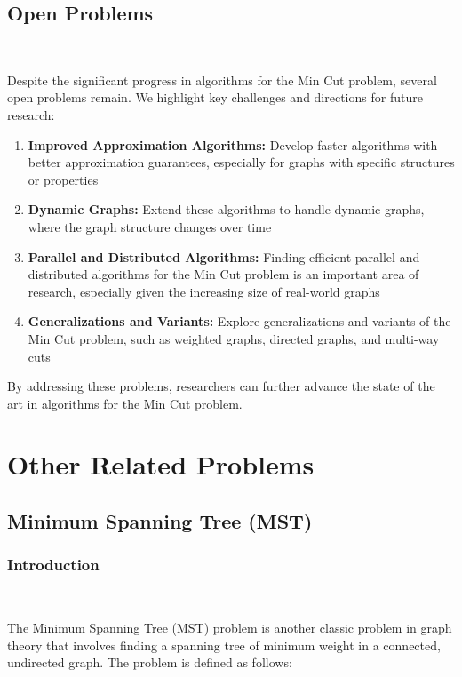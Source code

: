 \documentclass[11pt]{article}
\theoremstyle{plain}
\begin{document}

\subsection{Open Problems}\

Despite the significant progress in algorithms for the Min Cut problem, several open problems remain. We highlight key challenges and directions for future research:
\begin{enumerate}
    \item \textbf{Improved Approximation Algorithms:} Develop faster algorithms with better approximation guarantees, especially for graphs with specific structures or properties
    \item \textbf{Dynamic Graphs:} Extend these algorithms to handle dynamic graphs, where the graph structure changes over time
    \item \textbf{Parallel and Distributed Algorithms:} Finding efficient parallel and distributed algorithms for the Min Cut problem is an important area of research, especially given the increasing size of real-world graphs
    \item \textbf{Generalizations and Variants:} Explore generalizations and variants of the Min Cut problem, such as weighted graphs, directed graphs, and multi-way cuts
\end{enumerate}

By addressing these problems, researchers can further advance the state of the art in algorithms for the Min Cut problem.

\section{Other Related Problems}

\subsection{Minimum Spanning Tree (MST)}

\subsubsection{Introduction}\

The Minimum Spanning Tree (MST) problem is another classic problem in graph theory that involves finding a spanning tree of minimum weight in a connected, undirected graph. The problem is defined as follows:
\end{document}
